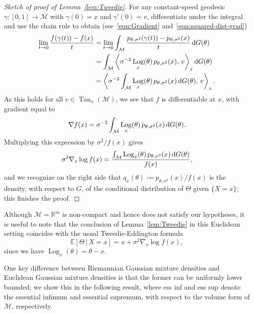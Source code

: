 \documentclass[preprint]{imsart}
\theoremstyle{plain}
\theoremstyle{definition}
\newcommand{\Rbb}{\mathbb{R}}
\newcommand{\Ebb}{\mathbb{E}}
\newcommand{\Mcal}{\mathcal{M}}
\newcommand{\diff}{\textnormal{d}}
\DeclareMathOperator{\Tan}{Tan}
\DeclareMathOperator{\Log}{Log}
\begin{document}
\begin{proof}[Sketch of proof of Lemma~\ref{lem:Tweedie}]
    For any constant-speed geodesic $\gamma:[0,1]\to\Mcal$ with $\gamma(0) = x$ and $\gamma'(0) = v$, differentiate under the integral and use the chain rule to obtain (see~\eqref{eqn:Gradient} and~\eqref{eqn:squared-dist-grad})
    \begin{align*}
        \lim_{t\to 0}\frac{f(\gamma(t))-f(x)}{t} &= \lim_{t\to 0}\int_{\Mcal}\frac{p_{\theta,\sigma^2}(\gamma(t))-p_{\theta,\sigma^2}(x)}{t}\,\diff G(\theta) \\
        &= \int_{\Mcal}
        \left\langle
            \sigma^{-2}\Log_x(\theta)\,p_{\theta,\sigma^2}(x),\,v
        \right\rangle_x
        \diff G(\theta) \\
        &= \left\langle
            \sigma^{-2}\int_{\Mcal}\Log_x(\theta)\,p_{\theta,\sigma^2}(x)\,\diff G(\theta),\,v
        \right\rangle_x.
    \end{align*}
    As this holds for all $v\in\Tan_x(\Mcal)$, we see that $f$ is differentiable at $x$, with gradient equal to
    \[
        \nabla f(x)=\sigma^{-2}\int_{\Mcal}\Log_x(\theta)\,p_{\theta,\sigma^2}(x)\,\diff G(\theta).
    \]
    Multiplying this expression by $\sigma^2/f(x)$ gives
    \[
        \sigma^2\nabla_x\log f(x)
        =
        \frac{\int_{\Mcal}\Log_x(\theta)\,p_{\theta,\sigma^2}(x)\,\diff G(\theta)}{f(x)},
    \]
    and we recognize on the right side that $q_x(\theta):=p_{\theta,\sigma^2}(x)/f(x)$ is the density, with respect to $G$, of the conditional distribution of $\Theta$ given $\{X=x\}$; this finishes the proof.
\end{proof}




Although $\Mcal=\Rbb^m$ is non-compact and hence does not satisfy our hypotheses, it is useful to note that the conclusion of Lemma~\ref{lem:Tweedie} in this Euclidean setting coincides with the usual Tweedie-Eddington formula
\begin{equation*}
    \Ebb[\Theta\,|\,X=x] = x + \sigma^2\nabla_x \log f(x),
\end{equation*}
since we have $\Log_x(\theta) = \theta-x$.

One key difference between Riemannian Gaussian mixture densities and Euclidean Gaussian mixture densities is that the former can be uniformly lower bounded; we show this in the following result, where ess inf and ess sup denote the essential infimum and essential supremum, with respect to the volume form of $\Mcal$, respectively.
\end{document}
